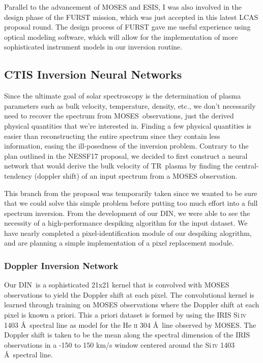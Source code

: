 \documentclass[10pt,letterpaper]{article}
\newcommand{\SiIV}{Si\,\textsc{iv} 1403 \AA}
\newcommand{\HeII}{He \textsc{ii} 304 \AA}
\newcommand{\TR}{\ac{TR}}
\newcommand{\MOSES}{\ac{MOSES}}
\newcommand{\DIN}{\ac{DIN}}
\begin{document}
		Parallel to the advancement of MOSES and ESIS, I was also involved in the design phase of the FURST mission, which was just accepted in this latest LCAS proposal round.
		The design process of FURST gave me useful experience using optical modeling software, which will allow for the implementation of more sophisticated instrument models in our inversion routine.
	
		\subsection{CTIS Inversion Neural Networks}
		
			Since the ultimate goal of solar spectroscopy is the determination of plasma parameters such as bulk velocity, temperature, density, etc., we don't necessarily need to recover the spectrum from \MOSES\ observations, just the derived physical quantities that we're interested in. 
			Finding a few physical quantities is easier than reconstructing the entire spectrum since they contain less information, easing the ill-posedness of the inversion problem.
			Contrary to the plan outlined in the NESSF17 proposal, we decided to first construct a neural network that would derive the bulk velocity of \TR\ plasma by finding the central-tendency (doppler shift) of an input spectrum from a MOSES observation.

			This branch from the proposal was temporarily taken since we wanted to be sure that we could solve this simple problem before putting too much effort into a full spectrum inversion.
			From the development of our \DIN, we were able to see the necessity of a high-performance despiking algorithm for the input dataset.
			We have nearly completed a pixel-identification module of our despiking alogrithm, and are planning a simple implementation of a pixel replacement module.
				
			\subsubsection{Doppler Inversion Network}
				
				Our \DIN\ is a sophisticated 21x21 kernel that is convolved with MOSES observations to yield the Doppler shift at each pixel.
				The convolutional kernel is learned through training on MOSES observations where the Doppler shift at each pixel is known a priori.
				This a priori dataset is formed by using the IRIS \SiIV\ spectral line as model for the \HeII\ line observed by \MOSES.
				The Doppler shift is taken to be the mean along the spectral dimension of the IRIS observations in a -150 to 150 km/s window centered around the \SiIV\ spectral line.
				
\end{document}
